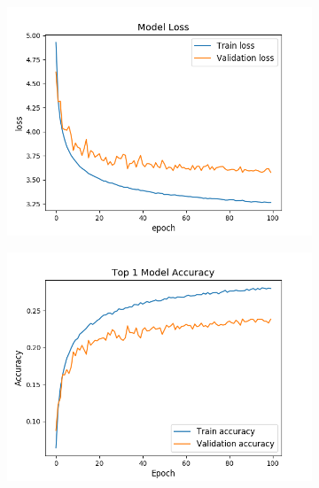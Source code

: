 \begin{figure}[!h]
        \centering
        \begin{subfigure}[b]{0.32\textwidth}
            \centering
            \includegraphics[width=\textwidth]{images/adam_final_no_fc_100batch_loss.png}
            \caption[]%
            {{\small }}
        \end{subfigure}
        \hfill
        \begin{subfigure}[b]{0.32\textwidth}
            \centering
            \includegraphics[width=\textwidth]{images/adam_final_no_fc_100batch_top1.png}
            \caption[]%
            {{\small }}
        \end{subfigure}
        \hfill
        \begin{subfigure}[b]{0.32\textwidth}

\end{subfigure}
\end{figure}
